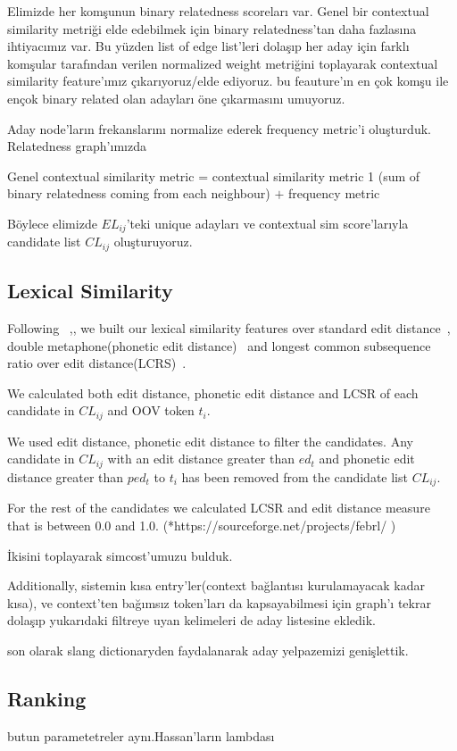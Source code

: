 Elimizde her komşunun binary relatedness scoreları var. Genel bir contextual similarity metriği elde edebilmek için binary relatedness'tan daha fazlasına ihtiyacımız var. Bu yüzden list of edge list'leri dolaşıp her aday için farklı komşular tarafından verilen normalized weight metriğini toplayarak contextual similarity feature'ımız çıkarıyoruz/elde ediyoruz. bu feauture'ın en çok komşu ile ençok binary related olan adayları öne çıkarmasını umuyoruz.

Aday node'ların frekanslarını normalize ederek frequency metric'i oluşturduk. Relatedness graph'ımızda

Genel contextual similarity metric = contextual similarity metric 1 (sum of binary relatedness coming from each neighbour) $+$ frequency metric

Böylece elimizde $EL_{ij}$'teki unique adayları ve contextual sim score'larıyla candidate list $CL_{ij}$ oluşturuyoruz.

\subsection{Lexical Similarity}

Following ~\cite{Han:2011:LNS:2002472.2002520},\cite{DBLP:conf/acl/HassanM13}, we built our lexical similarity features over standard edit distance~\cite{levenshtein1966bcc}, double metaphone(phonetic edit distance)~\cite{Philips:2000:DMS:349124.349132} and longest common subsequence ratio over edit distance(LCRS)~\cite{Contractor:2010:UCN:1944566.1944588}.

We calculated both edit distance, phonetic edit distance and LCSR of each candidate in $CL_{ij}$ and OOV token $t_i$.

We used edit distance, phonetic edit distance to filter the candidates. Any candidate in $CL_{ij}$ with an edit distance greater than $ed_t$ and phonetic edit distance greater than $ped_t$ to $t_i$ has been removed from the candidate list $CL_{ij}$.

For the rest of the candidates we calculated LCSR and edit distance measure that is between 0.0 and 1.0. (*https://sourceforge.net/projects/febrl/ )

İkisini toplayarak simcost'umuzu bulduk.

Additionally, sistemin kısa entry'ler(context bağlantısı kurulamayacak kadar kısa), ve context'ten bağımsız token'ları da kapsayabilmesi için graph'ı tekrar dolaşıp yukarıdaki filtreye uyan kelimeleri de aday listesine ekledik.

son olarak slang dictionaryden faydalanarak aday yelpazemizi genişlettik.

\subsection{Ranking}

butun parametetreler aynı.Hassan'ların lambdası
